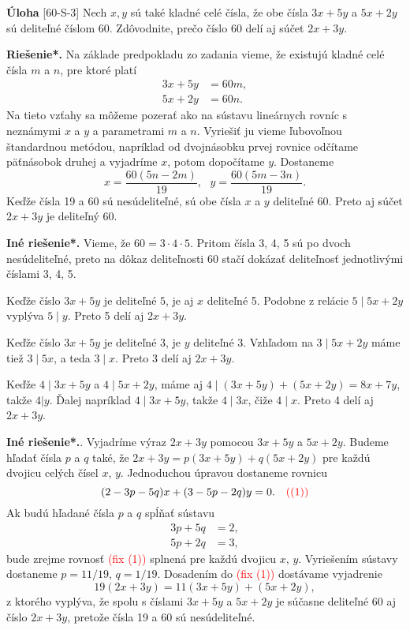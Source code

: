 \documentclass{article}
\newcommand{\rieh}{\textbf{Riešenie*.} }
\newcommand\todo[1]{\noindent\textcolor{red}{(#1)}}
\newcommand{\problem}[3]{
  \begin{tcolorbox}[breakable,notitle,boxrule=0pt,colback=light-gray,colframe=light-gray]
    \textbf{Úloha}
    [#1] #2
  \end{tcolorbox}
  \noindent#3
}
\begin{document}
\problem{60-S-3}{
Nech $x, y$ sú také kladné celé čísla, že obe čísla $3x + 5y$ a $5x + 2y$ sú deliteľné číslom 60. Zdôvodnite, prečo číslo 60 delí aj súčet $2x + 3y$.
}{
\rieh Na základe predpokladu zo zadania vieme, že existujú kladné celé čísla $m$ a $n$, pre ktoré platí
\begin{align*}
3x + 5y &= 60m,\\
5x + 2y &= 60n.
\end{align*}
Na tieto vzťahy sa môžeme pozerať ako na sústavu lineárnych rovníc s neznámymi $x$ a $y$ a parametrami $m$ a $n$. Vyriešiť ju vieme ľubovoľnou štandardnou metódou, napríklad od dvojnásobku prvej rovnice odčítame päťnásobok druhej a vyjadríme $x$, potom dopočítame $y$. Dostaneme
$$x = \frac{60(5n - 2m)}{19}, \ \ \ y =\frac{60(5m - 3n)}{19}.$$
Keďže čísla 19 a 60 sú nesúdeliteľné, sú obe čísla $x$ a $y$ deliteľné 60. Preto aj súčet $2x + 3y$ je deliteľný 60.

\textbf{Iné riešenie*.} Vieme, že $60 = 3 \cdot 4 \cdot 5$. Pritom čísla 3, 4, 5 sú po dvoch nesúdeliteľné, preto na dôkaz deliteľnosti 60 stačí dokázať deliteľnosť jednotlivými číslami 3, 4, 5.

Keďže číslo $3x + 5y$ je deliteľné $5$, je aj $x$ deliteľné 5. Podobne z relácie $5 \mid 5x + 2y$ vyplýva $5 \mid y$. Preto 5 delí aj $2x + 3y$.

Keďže číslo $3x + 5y$ je deliteľné 3, je $y$ deliteľné 3. Vzhľadom na $3 \mid 5x + 2y$ máme tiež $3 \mid 5x$, a teda $3 \mid x$. Preto 3 delí aj $2x + 3y$.

Keďže $4 \mid 3x + 5y$ a $4 \mid 5x + 2y$, máme aj $4 \mid (3x + 5y) + (5x + 2y) = 8x + 7y$, takže $4 | y$. Ďalej napríklad $4 \mid 3x + 5y$, takže $4 \mid 3x$, čiže $4 \mid x$. Preto 4 delí aj $2x + 3y$.

\textbf{Iné riešenie*.}. Vyjadríme výraz $2x + 3y$ pomocou $3x + 5y$ a $5x + 2y$. Budeme hľadať čísla $p$ a $q$ také, že $2x + 3y = p(3x + 5y) + q(5x + 2y)$ pre každú dvojicu celých čísel $x$, $y$. Jednoduchou úpravou dostaneme rovnicu
$$(2 - 3p - 5q)x + (3 - 5p - 2q)y = 0. \ \ \ \todo{(1)}$$
Ak budú hľadané čísla $p$ a $q$ spĺňať sústavu
\begin{align*}
3p + 5q &= 2,\\
5p + 2q &= 3,
\end{align*}
bude zrejme rovnosť \todo{fix (1)} splnená pre každú dvojicu $x$, $y$. Vyriešením sústavy dostaneme $p = 11/19$, $q = 1/19$. Dosadením do \todo{fix (1)} dostávame vyjadrenie
$$19(2x + 3y) = 11(3x + 5y) + (5x + 2y),$$
z ktorého vyplýva, že spolu s číslami $3x + 5y$ a $5x + 2y$ je súčasne deliteľné 60 aj číslo $2x + 3y$, pretože čísla 19 a 60 sú nesúdeliteľné.
}
\end{document}
